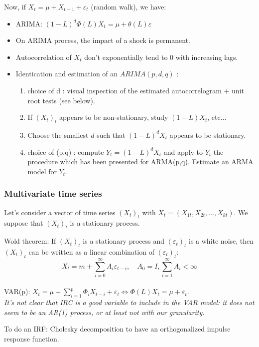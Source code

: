 Now, if $X_t = \mu + X_{t-1} + \varepsilon_t$ (random walk), we have: 
\begin{itemize}
    \item ARIMA: $(1 - L)^d \Phi(L)X_t = \mu + \theta(L) \varepsilon$
    \item On ARIMA process, the impact of a shock is permanent.
    \item Autocorrelation of $X_t$ don't exponentially tend to 0 with increasing lags.
    \item Identication and estimation of an $ARIMA(p,d,q)$ :
    \begin{enumerate}
    \item choice of d : visual inspection of the estimated
    autocorrelogram + unit root tests (see below).
    \item If $(X_t)_t$ appears to be non-stationary, study $(1-L)X_t$, etc...
    \item Choose the smallest $d$ such that $(1-L)^d X_t$ appears to be stationary.
    \item choice of (p,q) : compute $Y_t = (1-L)^d X_t$ and apply to $Y_t$ the procedure which has been presented for ARMA(p,q).
    Estimate an ARMA model for $Y_t$.
    \end{enumerate}
\end{itemize}

\subsubsection{Multivariate time series}
Let's consider a vector of time series $(X_t)_t$ with $X_t = (X_{1t}, X_{2t}, \ldots, X_{kt})$. We suppose that $(X_t)_t$ is a stationary process. 

Wold theorem: 
If $(X_t)_t$ is a stationary process and $(\varepsilon_t)_t$ is a white noise, then $(X_t)_t$ can be written as a linear combination of $(\varepsilon_t)_t$: $$X_t = m + \sum_{i=0}^{\infty} A_i \varepsilon_{t-i}, \quad A_0 = I, \sum_{i = 1}^\infty A_i < \infty$$ \\

VAR(p): $X_t = \mu + \sum_{i=1}^{p} \Phi_i X_{t-i} + \varepsilon_t \Leftrightarrow  \Phi(L)X_t = \mu + \varepsilon_t$. \\

\textit{It's not clear that IRC is a good variable to include in the VAR model: it does not seem to be an AR(1) process, or at least not with our granularity.}

To do an IRF: Cholesky decomposition to have an orthogonalized impulse response function.

